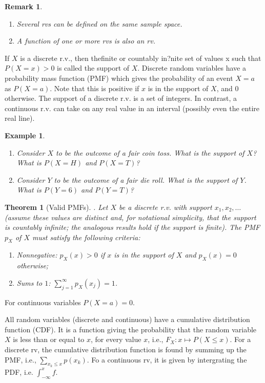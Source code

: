 \documentclass[12pt,a4paper]{article}
\newtheorem{theorem}{Theorem}
\newtheorem{example}{Example}
\newtheorem{remark}{Remark}
\begin{document}
\begin{remark}
	\begin{enumerate}
		\item Several rvs can be defined on the same sample space.
		\item A function of one or more rvs is also an rv.
	\end{enumerate}
\end{remark}
If $X$ is a discrete r.v., then thefinite or countably in?nite set of values x such that $P (X = x) > 0$ is called the
support of $X$.
Discrete random variables have a probability mass function (PMF) which gives the probability of an event $X=a$ as $P(X=a)$.
Note that this is positive if $x$ is in the support of $X$, and $0$ otherwise.
The support of a discrete r.v. is a set of integers.
In contrast, a continuous r.v. can take on any real value in an interval (possibly even the entire real line).

\begin{example}
	\begin{enumerate}
		\item Consider $X$ to be the outcome of a fair coin toss.
		What is the support of $X$? What is $P(X=H)$ and $P(X=T)$?
		\item Consider $Y$ to be the outcome of a fair die roll. What is the support of $Y$. What is $P(Y=6)$ and $P(Y=T)$?
	\end{enumerate}
\end{example}
\begin{theorem}[Valid PMFs]. Let $X$ be a discrete r.v. with support $x_1, x_2, \dots$
	(assume these values are distinct and, for notational simplicity, that the support is countably infinite; the analogous results hold if the support is finite). 
	The PMF $p_X$
	of $X$ must satisfy the following criteria:
	\begin{enumerate}
		\item Nonnegative: $p_X (x) > 0$ if $x$ is in the support of $X$ and $p_X(x) = 0$ otherwise;
		\item Sums to $1$: $\sum_{j=1}^{\infty} p_X(x_j ) = 1$.
	\end{enumerate}
\end{theorem}
For continuous variables $P(X=a) = 0$.

All random variables (discrete and continuous) have a cumulative distribution function (CDF). 
It is a function giving the probability that the random variable $X$ is less than or equal to $x$, for every value $x$, i.e., $F_X: x\mapsto P(X\leq x)$. 
For a discrete rv, the cumulative distribution function is found by summing up the PMF, i.e., $\sum_{x_k\leq x} p(x_k)$.
Fo a continuous rv, it is given by intergrating the PDF, i.e. $\int_{-\infty}^x f$.
\end{document}
